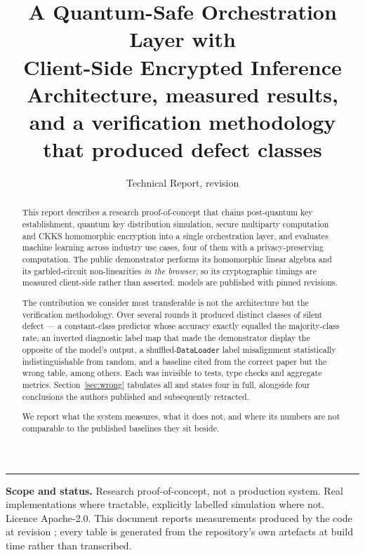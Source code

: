 \documentclass[11pt,a4paper]{article}
\title{\vspace{-1.4cm}\textbf{A Quantum-Safe Orchestration Layer with\\Client-Side Encrypted Inference}\\[3pt]
\large Architecture, measured results, and a verification methodology\\that produced \ndefectclasses{} defect classes}
\author{Technical Report, revision \texttt{\gitsha}}
\date{\reportdate}
\begin{document}
\maketitle
\thispagestyle{fancy}

\begin{abstract}
\noindent
This report describes a research proof-of-concept that chains post-quantum key establishment,
quantum key distribution simulation, secure multiparty computation and CKKS homomorphic encryption
into a single orchestration layer, and evaluates machine learning across \nusecases{} industry use
cases, four of them with a privacy-preserving computation. The public demonstrator performs its
homomorphic linear algebra and its garbled-circuit non-linearities \emph{in the browser}, so its
cryptographic timings are measured client-side rather than asserted. \npublished{} models are
published with pinned revisions.

The contribution we consider most transferable is not the architecture but the verification
methodology. Over several rounds it produced \ndefectclasses{} distinct classes of silent defect --- a
constant-class predictor whose accuracy exactly equalled the majority-class rate, an inverted
diagnostic label map that made the demonstrator display the opposite of the model's output, a
shuffled-\texttt{DataLoader} label misalignment statistically indistinguishable from random,
and a baseline cited from the correct paper but the wrong table, among others. Each was invisible to
tests, type checks and aggregate metrics. Section~\ref{sec:wrong} tabulates all \ndefectclasses{} and
states four in full, alongside four conclusions the authors published and subsequently retracted.

We report what the system measures, what it does not, and where its numbers are not comparable to
the published baselines they sit beside.
\end{abstract}

\vspace{-2mm}
\noindent\rule{\textwidth}{0.4pt}
\begin{small}
\textbf{Scope and status.} Research proof-of-concept, not a production system. Real implementations
where tractable, explicitly labelled simulation where not. Licence Apache-2.0. This document reports
measurements produced by the code at revision \texttt{\gitsha}; every table is generated from the
repository's own artefacts at build time rather than transcribed.
\end{small}
\end{document}
